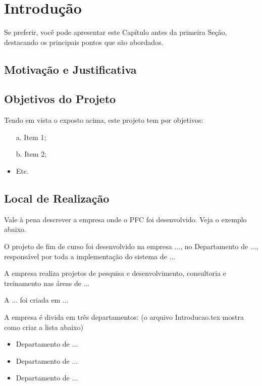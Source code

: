 \chapter{Introdução}

Se preferir, você pode apresentar este Capítulo antes da primeira Seção, destacando os principais pontos que são abordados. %

\section{Motivação e Justificativa}


\section{Objetivos do Projeto}

Tendo em vista o exposto acima, este projeto tem por objetivos:

\begin{itemize}
\item[a.] Item 1;
\item[b.] Item 2;
\item Etc.
\end{itemize}




\section{Local de Realização}

Vale à pena descrever a empresa onde o PFC foi desenvolvido. Veja o exemplo abaixo.

O projeto de fim de curso foi desenvolvido na empresa ..., no Departamento de ..., responsável por toda a implementação do sistema de ...

A empresa realiza projetos de pesquisa e desenvolvimento, consultoria e treinamento nas áreas de ...

A ... foi criada em ...  

A empresa é divida em três departamentos: (o arquivo Introducao.tex mostra como criar a lista abaixo) 

\begin{itemize}
\item Departamento de ... 
\item Departamento de ...
\item Departamento de ...
\end{itemize}


